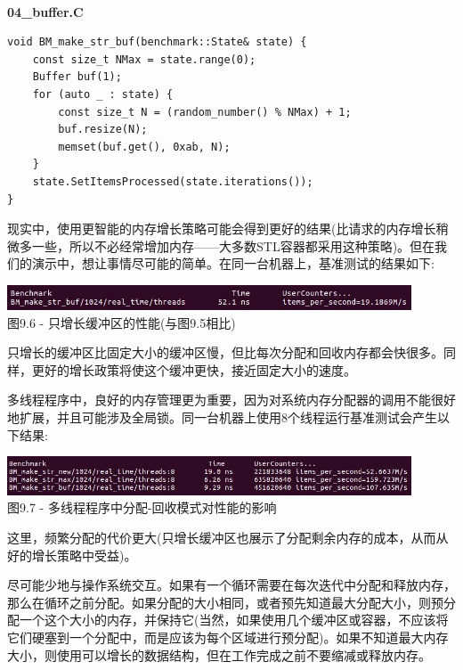 \hspace*{\fill} \\ %
\noindent
\textbf{04\_buffer.C}
\begin{lstlisting}[style=styleCXX]
void BM_make_str_buf(benchmark::State& state) {
	const size_t NMax = state.range(0);
	Buffer buf(1);
	for (auto _ : state) {
		const size_t N = (random_number() % NMax) + 1;     
		buf.resize(N);
		memset(buf.get(), 0xab, N);
	}
	state.SetItemsProcessed(state.iterations());
}
\end{lstlisting}

现实中，使用更智能的内存增长策略可能会得到更好的结果(比请求的内存增长稍微多一些，所以不必经常增加内存——大多数STL容器都采用这种策略)。但在我们的演示中，想让事情尽可能的简单。在同一台机器上，基准测试的结果如下:

\begin{center}
\includegraphics[width=0.9\textwidth]{content/3/chapter9/images/6.jpg}\\
图9.6 - 只增长缓冲区的性能(与图9.5相比)
\end{center}

只增长的缓冲区比固定大小的缓冲区慢，但比每次分配和回收内存都会快很多。同样，更好的增长政策将使这个缓冲更快，接近固定大小的速度。 

多线程程序中，良好的内存管理更为重要，因为对系统内存分配器的调用不能很好地扩展，并且可能涉及全局锁。同一台机器上使用8个线程运行基准测试会产生以下结果:

\begin{center}
\includegraphics[width=0.9\textwidth]{content/3/chapter9/images/7.jpg}\\
图9.7 - 多线程程序中分配-回收模式对性能的影响
\end{center}

这里，频繁分配的代价更大(只增长缓冲区也展示了分配剩余内存的成本，从而从好的增长策略中受益)。 

尽可能少地与操作系统交互。如果有一个循环需要在每次迭代中分配和释放内存，那么在循环之前分配。如果分配的大小相同，或者预先知道最大分配大小，则预分配一个这个大小的内存，并保持它(当然，如果使用几个缓冲区或容器，不应该将它们硬塞到一个分配中，而是应该为每个区域进行预分配)。如果不知道最大内存大小，则使用可以增长的数据结构，但在工作完成之前不要缩减或释放内存。 

